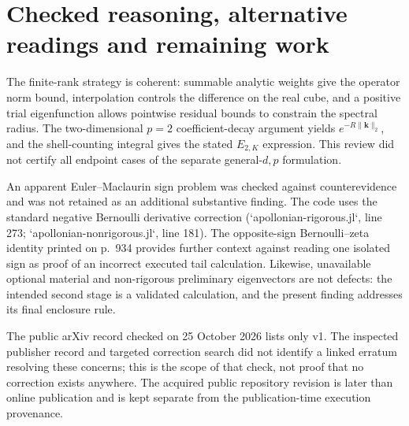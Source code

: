 \documentclass[10pt]{article}
\begin{document}
\section*{Checked reasoning, alternative readings and remaining work}
The finite-rank strategy is coherent: summable analytic weights give the operator norm bound, interpolation controls the difference on the real cube, and a positive trial eigenfunction allows pointwise residual bounds to constrain the spectral radius. The two-dimensional \(p=2\) coefficient-decay argument yields \(e^{-R\|\mathbf k\|_2}\), and the shell-counting integral gives the stated \(E_{2,K}\) expression. This review did not certify all endpoint cases of the separate general-\(d,p\) formulation.\par
An apparent Euler–Maclaurin sign problem was checked against counterevidence and was not retained as an additional substantive finding. The code uses the standard negative Bernoulli derivative correction (`apollonian-rigorous.jl`, line 273; `apollonian-nonrigorous.jl`, line 181). The opposite-sign Bernoulli–zeta identity printed on p. 934 provides further context against reading one isolated sign as proof of an incorrect executed tail calculation. Likewise, unavailable optional material and non-rigorous preliminary eigenvectors are not defects: the intended second stage is a validated calculation, and the present finding addresses its final enclosure rule.\par
The public arXiv record checked on 25 October 2026 lists only v1. The inspected publisher record and targeted correction search did not identify a linked erratum resolving these concerns; this is the scope of that check, not proof that no correction exists anywhere. The acquired public repository revision is later than online publication and is kept separate from the publication-time execution provenance.\par
\end{document}
